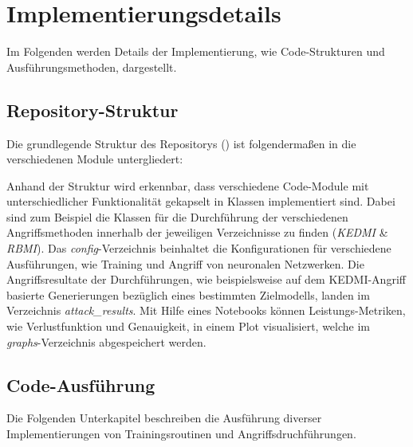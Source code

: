 \section{Implementierungsdetails} \label{chpt:Implementierung_Details}
Im Folgenden werden Details der Implementierung, wie Code-Strukturen und Ausführungsmethoden, dargestellt.
\subsection{Repository-Struktur}
Die grundlegende Struktur des Repositorys (\cite{weber_hosthansba_code_2024}) ist folgendermaßen in die verschiedenen Module untergliedert:

Anhand der Struktur wird erkennbar, dass verschiedene Code-Module mit unterschiedlicher Funktionalität gekapselt in Klassen implementiert sind. Dabei sind zum Beispiel die Klassen für die Durchführung der verschiedenen Angriffsmethoden innerhalb der jeweiligen Verzeichnisse zu finden (\textit{KEDMI} \& \textit{RBMI}). Das \textit{config}-Verzeichnis beinhaltet die Konfigurationen für verschiedene Ausführungen, wie Training und Angriff von neuronalen Netzwerken. Die Angriffsresultate der Durchführungen, wie beispielsweise auf dem KEDMI-Angriff basierte Generierungen bezüglich eines bestimmten Zielmodells, landen im Verzeichnis \textit{attack\_results}. Mit Hilfe eines Notebooks können Leistungs-Metriken, wie Verlustfunktion und Genauigkeit, in einem Plot visualisiert, welche im \textit{graphs}-Verzeichnis abgespeichert werden.


\subsection{Code-Ausführung}
Die Folgenden Unterkapitel beschreiben die Ausführung diverser Implementierungen von Trainingsroutinen und Angriffsdruchführungen.
